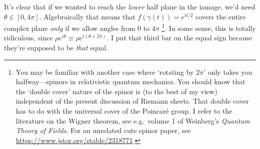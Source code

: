 It's clear that if we wanted to reach the \emph{lower} half plane in the iamage, we'd need $\theta \in [0, 4\pi]$. Algebraically that means that $f(\gamma(t)) = e^{it/2}$ covers the entire complex plane \emph{only} if we allow angles from 0 to $4\pi$
\footnote{You may be familiar with another case where `rotating by $2\pi$' only takes you halfway---spinors in relativistic quantum mechanics. You should know that the `double cover' nature of the spinor is (to the best of my view) independent of the present discussion of Riemann sheets. That double cover has to do with the universal cover of the Poincar\'e group. I refer to the literature on the Wigner theorem, see e.g.\ volume 1 of Weinberg's \emph{Quantum Theory of Fields}. For an unrelated cute spinor paper, see \url{https://www.jstor.org/stable/2318771}.}. In some sense, this is totally ridiculous, since $\rho e^{i\theta} \equiv \rho e^{i(\theta+2\pi)}$. I put that third bar on the equal sign because they're supposed to be \emph{that} equal.

